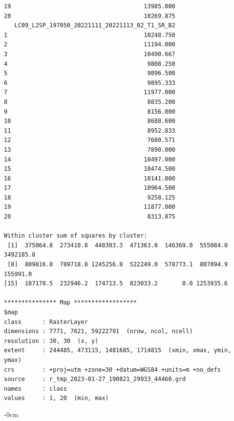 \documentclass[remotesensing,article,submit,pdftex,moreauthors]{Definitions/mdpi}
\begin{document}
\begin{scriptsize}
\begin{verbatim}
19                                      13985.000
20                                      10269.875
   LC09_L2SP_197050_20221111_20221113_02_T1_SR_B2
1                                       10248.750
2                                       11194.000
3                                       10490.667
4                                        9808.250
5                                        9896.500
6                                        9895.333
7                                       11977.000
8                                        8835.200
9                                        8156.800
10                                       8688.600
11                                       8952.833
12                                       7680.571
13                                       7890.000
14                                      10497.000
15                                      10474.500
16                                      10141.000
17                                      10964.500
18                                       9258.125
19                                      11877.000
20                                       8313.875

Within cluster sum of squares by cluster:
 [1]  375064.8  273410.8  448303.3  471363.0  146369.0  555084.0 3492185.8
 [8]  809816.8  789718.8 1245256.8  522249.0  578773.1  807094.9  155991.0
[15]  187178.5  232946.2  174713.5  823033.2       0.0 1253935.6

*************** Map ******************
$map
class      : RasterLayer 
dimensions : 7771, 7621, 59222791  (nrow, ncol, ncell)
resolution : 30, 30  (x, y)
extent     : 244485, 473115, 1481685, 1714815  (xmin, xmax, ymin, ymax)
crs        : +proj=utm +zone=30 +datum=WGS84 +units=m +no_defs 
source     : r_tmp_2023-01-27_190821_29933_44460.grd 
names      : class 
values     : 1, 20  (min, max)
\end{verbatim}
\end{scriptsize}

\begin{adjustwidth}{-\extralength}{0cm}



\end{adjustwidth}
\end{document}
